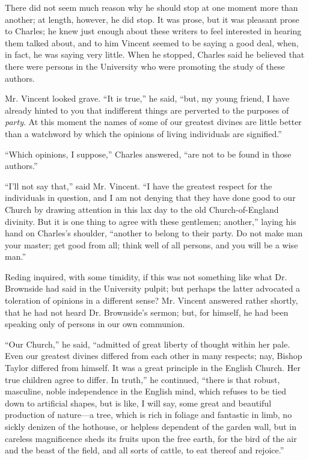 There did not seem much reason why he should stop at one moment
more than another; at length, however, he did stop. It was prose, but
it was pleasant prose to Charles; he knew just enough about these
writers to feel interested in hearing them talked about, and to him
Vincent seemed to be saying a good deal, when, in fact, he was saying
very little. When he stopped, Charles said he believed that there were
persons in the University who were promoting the study of these
authors.

Mr. Vincent looked grave. ``It is true,'' he said,
``but, my young friend, I have already hinted to you that
indifferent things are perverted to the purposes of \emph{party}. At
this moment the names of some of our greatest divines are little
better than a watchword by which the opinions of living individuals
are signified.''

``Which opinions, I suppose,'' Charles answered, ``are
not to be found in those authors.''

``I'll not say that,'' said Mr. Vincent. ``I have the
greatest respect for the individuals in question, and I am not denying
that they have done good to our Church by drawing attention in this
lax day to the old Church-of-England divinity. But it is one thing to
agree with these gentlemen; another,'' laying his hand on Charles's
shoulder, ``another to belong to their party. Do not make man your
master; get good from all; think well of all persons, and you will be
a wise man.''

Reding inquired, with some timidity, if this was not something like
what Dr. Brownside had said in the University pulpit; but perhaps the
latter advocated a toleration of opinions in a different sense? Mr.
Vincent answered rather shortly, that he had not heard Dr. Brownside's
sermon; but, for himself, he had been speaking only of persons in our
own communion.

``Our Church,'' he said, ``admitted of great liberty of
thought within her pale. Even our greatest divines differed from each
other in many respects; nay, Bishop Taylor differed from himself. It
was a great principle in the English Church. Her true children agree
to differ. In truth,'' he continued, ``there is that robust,
masculine, noble independence in the English mind, which refuses to be
tied down to artificial shapes, but is like, I will say, some great
and beautiful production of nature—a tree, which is rich in foliage
and fantastic in limb, no sickly denizen of the hothouse, or
helpless dependent of the garden wall, but in careless magnificence
sheds its fruits upon the free earth, for the bird of the air and the
beast of the field, and all sorts of cattle, to eat thereof and
rejoice.''

